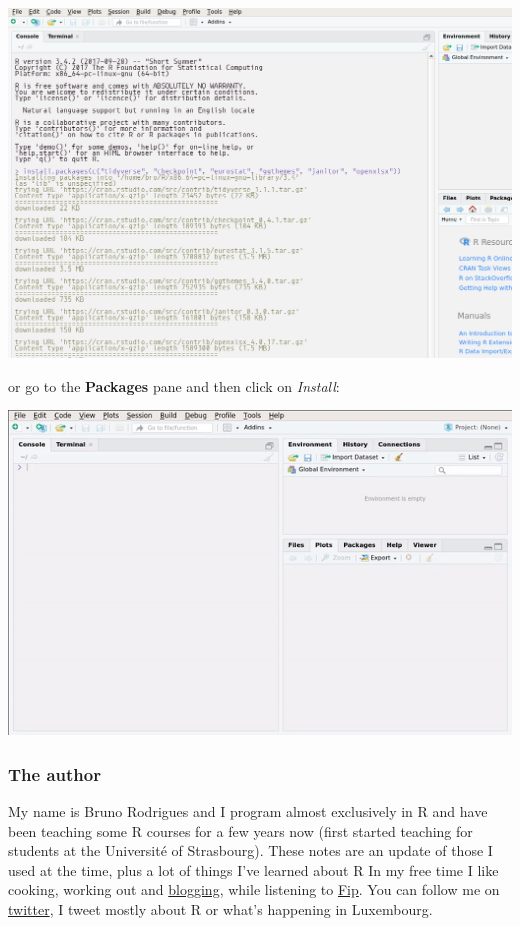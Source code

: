 \documentclass[]{gitbook}
\theoremstyle{definition}
\theoremstyle{definition}
\theoremstyle{definition}
\theoremstyle{remark}
\begin{document}
\includegraphics[width=14.9in]{pics/install_packages}

or go to the \textbf{Packages} pane and then click on \emph{Install}:

\includegraphics{pics/rstudio_install_packages.gif}

\hypertarget{the-author}{%
\subsubsection*{The author}\label{the-author}}

My name is Bruno Rodrigues and I program almost exclusively in R and
have been teaching some R courses for a few years now (first started
teaching for students at the Université of Strasbourg). These notes are
an update of those I used at the time, plus a lot of things I've learned
about R In my free time I like cooking, working out and
\href{https://www.brodrigues.co}{blogging}, while listening to
\href{http://www.fipradio.fr/player}{Fip}. You can follow me on
\href{https://www.twitter.com/brodriguesco}{twitter}, I tweet mostly
about R or what's happening in Luxembourg.
\end{document}
